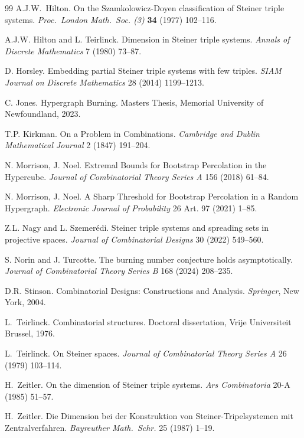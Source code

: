 \documentclass[12pt]{article}
\theoremstyle{definition}
\numberwithin{table}{section}
\begin{document}
\begin{thebibliography}{99}
 A.J.W.\ Hilton.  On the Szamkolowicz-Doyen classification of Steiner triple systems.  {\em Proc.\ London Math.\ Soc. (3)} {\bf 34} (1977) 102--116.

 A.J.W. Hilton and L. Teirlinck. Dimension in Steiner triple systems. \emph{Annals of Discrete Mathematics} 7 (1980) 73--87. 

D. Horsley.
Embedding partial {S}teiner triple systems with few triples. 
\emph{SIAM Journal on Discrete Mathematics}  28  (2014) 1199--1213.  

 C. Jones. Hypergraph Burning. Masters Thesis, Memorial University of Newfoundland, 2023.

 T.P. Kirkman. On a Problem in Combinations. \emph{Cambridge and Dublin Mathematical Journal} 2 (1847) 191--204.

 N. Morrison, J. Noel. Extremal Bounds for Bootstrap Percolation in the Hypercube. \emph{Journal of Combinatorial Theory Series A} 156 (2018) 61--84.

 N. Morrison, J. Noel. A Sharp Threshold for Bootstrap Percolation in a Random Hypergraph. \emph{Electronic Journal of Probability}  26 Art. 97 (2021) 1--85.

 Z.L. Nagy and L. Szemer\'{e}di.  Steiner triple systems and spreading sets in projective spaces.  \emph{Journal of Combinatorial Designs}  30 (2022) 549--560.

 S. Norin and J. Turcotte. The burning number conjecture holds asymptotically. 
\emph{Journal of Combinatorial Theory Series B}  168 (2024) 208--235.

 D.R. Stinson. Combinatorial Designs: Constructions and Analysis. \emph{Springer}, New York, 2004.

 L.\ Teirlinck.  Combinatorial structures.  Doctoral dissertation, Vrije Universiteit Brussel, 1976.

 L.\ Teirlinck.  On Steiner spaces.  \emph{Journal of Combinatorial Theory Series A} 26 (1979) 103--114.

 H.\ Zeitler.  On the dimension of Steiner triple systems. \emph{Ars Combinatoria} 20-A (1985) 51--57.

 H.\ Zeitler.  Die Dimension bei der Konstruktion von Steiner-Tripelsystemen mit Zentralverfahren.  {\em Bayreuther Math.\ Schr.} 25 (1987) 1--19.  

\end{thebibliography}
\end{document}

